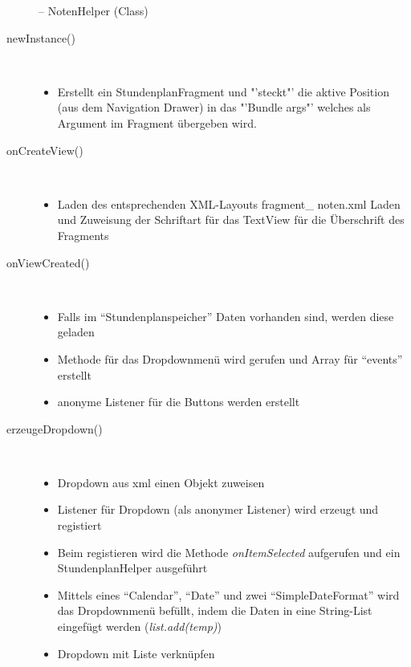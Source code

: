 \begin{description}
-- NotenHelper (Class)

\newpage


\item[newInstance()]~\par
\begin{itemize}
\item Erstellt ein StundenplanFragment und "'steckt"' die aktive Position (aus dem Navigation Drawer) in das "'Bundle args"' welches als Argument im Fragment übergeben wird.
\end{itemize} 
\item[onCreateView()]~\par
\begin{itemize}
\item Laden des entsprechenden XML-Layouts fragment\_ noten.xml
Laden und Zuweisung der Schriftart für das TextView für die Überschrift des Fragments
\end{itemize}

\item[onViewCreated()]~\par
\begin{itemize}
\item Falls im “Stundenplanspeicher” Daten vorhanden sind, werden diese geladen
\item Methode für das Dropdownmenü wird gerufen und Array für “events” erstellt
\item anonyme Listener für die Buttons werden erstellt
\end{itemize}

\item[erzeugeDropdown()]~\par
\begin{itemize}
\item Dropdown aus xml einen Objekt zuweisen
\item Listener für Dropdown (als anonymer Listener) wird erzeugt und registiert
\item Beim registieren wird die Methode \textit{onItemSelected} aufgerufen und ein StundenplanHelper ausgeführt
\item Mittels eines “Calendar”, “Date” und zwei “SimpleDateFormat” wird das Dropdownmenü befüllt, indem die Daten in eine String-List eingefügt werden (\textit{list.add(temp)})
\item Dropdown mit Liste verknüpfen
\end{itemize}
 

\end{description}
